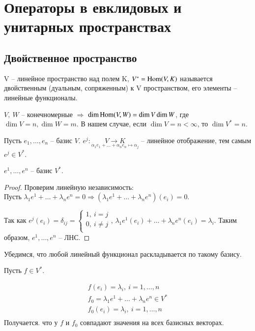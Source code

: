 \documentclass[main]{subfiles}
\begin{document}
\part{Операторы в евклидовых и унитарных пространствах}

\chapter{Двойственное пространство}


\begin{definition} 
    V -- линейное пространство над полем K, $V^*=\operatorname{Hom}(V,K)$ называется двойственным (дуальным, сопряженным) к V пространством, его элементы -- линейные функционалы.
\end{definition}

$V, \ W$ -- конечномерные $\Rightarrow$ $\dim\operatorname{Hom}(V,W) = \dim V \dim W$, где $\dim V = n,\dim W = m$.
В нашем случае, если $\dim V = n < \infty$, то $\dim V^* = n$.

Пусть $e_1,\dots,e_n \text{ -- базис } V$.
$e^j : \underset{\alpha_1e_1+\dots+\alpha_ne_n \mapsto \alpha_j}{V \to K}$ -- линейное отображение, тем самым $e^j \in V^*$.

\begin{proposition}
    $e^1,\dots,e^n$ -- базис $V^*$.
\end{proposition}
\begin{proof}
    Проверим линейную независимость: \\
    Пусть $\lambda_1e^1 + \dots + \lambda_ne^n = 0 \Rightarrow (\lambda_1e^1+\dots+\lambda_ne^n)(e_i)=0$.

    Так как $e^j(e_i)=\delta_{ij}=
        \begin{cases}
            1, \ i = j     \\
            0 , \ i \neq j \\
        \end{cases}
    $, $\lambda_1e^1(e_i) + \dots + \lambda_ne^n(e_i) = \lambda_i$.
    Таким образом, $e^1,\dots,e^n$ -- ЛНС.
\end{proof}

Убедимся, что любой линейный функционал раскладывается по такому базису.

Пусть $f \in V^*$.

\begin{gather*}
    f(e_i) = \lambda_i , \ i = 1,\dots, n \\
    f_0 = \lambda_1e^1 + \dots + \lambda_ne^n \in V^* \\
    f_0(e_i) = \lambda_i , \ i = 1,\dots, n \\
\end{gather*}
Получается. что у $f$ и $f_0$ совпадают значения на всех базисных векторах.
\end{document}
